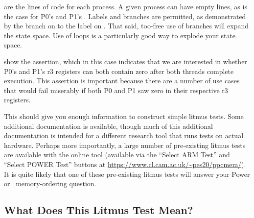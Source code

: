 \begin{fcvref}
\QuickQuizEnd

\begin{fcvref}
 are the lines of code for each process.
A given process can have empty lines, as is the case for P0's
 and P1's .
Labels and branches are permitted, as demonstrated by the branch
on  to the label on .
That said, too-free use of branches
will expand the state space. Use of loops is a particularly good way to
explode your state space.

 show the assertion, which in this case
indicates that we
are interested in whether P0's and P1's r3 registers can both contain
zero after both threads complete execution. This assertion is important
because there are a number of use cases that would fail miserably if
both P0 and P1 saw zero in their respective r3 registers.

This should give you enough information to construct simple litmus
tests. Some additional documentation is available, though much of this
additional documentation is intended for a different research tool that
runs tests on actual hardware. Perhaps more importantly, a large number of
pre-existing litmus tests are available with the online tool (available
via the ``Select ARM Test'' and ``Select POWER Test'' buttons at
\url{https://www.cl.cam.ac.uk/~pes20/ppcmem/}).
It is quite likely that one of these pre-existing litmus tests will
answer your Power or \ARM\ memory-ordering question.

\subsection{What Does This Litmus Test Mean?}
\label{sec:formal:What Does This Litmus Test Mean?}


\end{fcvref}
\end{fcvref}
